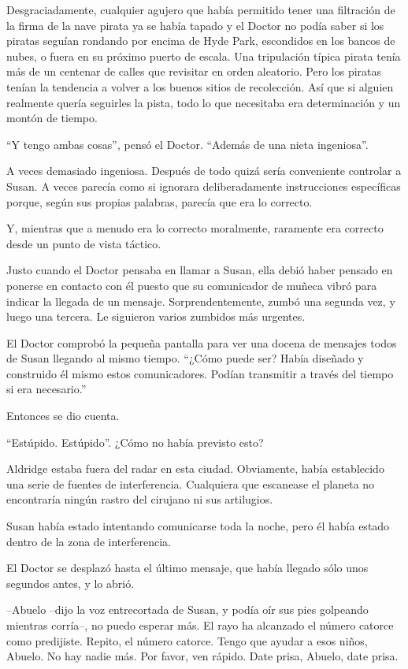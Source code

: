Desgraciadamente, cualquier agujero que había permitido tener una filtración de la firma de la nave pirata ya se había tapado y el Doctor no podía saber si los piratas seguían rondando por encima de Hyde Park, escondidos en los bancos de nubes, o fuera en su próximo puerto de escala. Una tripulación típica pirata tenía más de un centenar de calles que revisitar en orden aleatorio. Pero los piratas tenían la tendencia a volver a los buenos sitios de recolección. Así que si alguien realmente quería seguirles la pista, todo lo que necesitaba era determinación y un montón de tiempo.
 
``Y tengo ambas cosas'', pensó el Doctor. ``Además de una nieta ingeniosa''.
 
A veces demasiado ingeniosa. Después de todo quizá sería conveniente controlar a Susan. A veces parecía como si ignorara deliberadamente instrucciones específicas porque, según sus propias palabras, parecía que era lo correcto.
 
Y, mientras que a menudo era lo correcto moralmente, raramente era correcto desde un punto de vista táctico.
 
Justo cuando el Doctor pensaba en llamar a Susan, ella debió haber pensado en ponerse en contacto con él puesto que su comunicador de muñeca vibró para indicar la llegada de un mensaje. Sorprendentemente, zumbó una segunda vez, y luego una tercera. Le siguieron varios zumbidos más urgentes.
 
El Doctor comprobó la pequeña pantalla para ver una docena de mensajes todos de Susan llegando al mismo tiempo. ``¿Cómo puede ser? Había diseñado y construido él mismo estos comunicadores. Podían transmitir a través del tiempo si era necesario.''
 
Entonces se dio cuenta.
 
``Estúpido. Estúpido''. ¿Cómo no había previsto esto?
 
Aldridge estaba fuera del radar en esta ciudad. Obviamente, había establecido una serie de fuentes de interferencia. Cualquiera que escanease el planeta no encontraría ningún rastro del cirujano ni sus artilugios.
 
Susan había estado intentando comunicarse toda la noche, pero él había estado dentro de la zona de interferencia.
 
El Doctor se desplazó hasta el último mensaje, que había llegado sólo unos segundos antes, y lo abrió.
 
--Abuelo --dijo la voz entrecortada de Susan, y podía oír sus pies golpeando mientras corría--, no puedo esperar más. El rayo ha alcanzado el número catorce como predijiste. Repito, el número catorce. Tengo que ayudar a esos niños, Abuelo. No hay nadie más. Por favor, ven rápido. Date prisa, Abuelo, date prisa.
 
